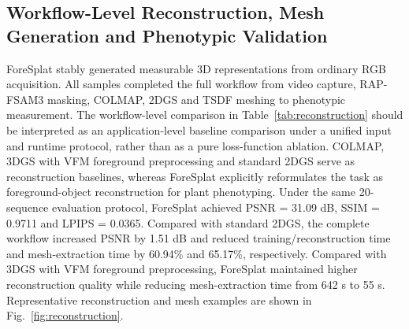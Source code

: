\documentclass[a4paper]{cas-sc}
\begin{document}
\subsection{Workflow-Level Reconstruction, Mesh Generation and Phenotypic Validation}\label{sec:workflow-validation-results}

ForeSplat stably generated measurable 3D representations from ordinary RGB acquisition. All samples completed the full workflow from video capture, RAP-FSAM3 masking, COLMAP, 2DGS and TSDF meshing to phenotypic measurement. The workflow-level comparison in Table~\ref{tab:reconstruction} should be interpreted as an application-level baseline comparison under a unified input and runtime protocol, rather than as a pure loss-function ablation. COLMAP, 3DGS with VFM foreground preprocessing and standard 2DGS serve as reconstruction baselines, whereas ForeSplat explicitly reformulates the task as foreground-object reconstruction for plant phenotyping. Under the same 20-sequence evaluation protocol, ForeSplat achieved PSNR = 31.09 dB, SSIM = 0.9711 and LPIPS = 0.0365. Compared with standard 2DGS, the complete workflow increased PSNR by 1.51 dB and reduced training/reconstruction time and mesh-extraction time by 60.94\% and 65.17\%, respectively. Compared with 3DGS with VFM foreground preprocessing, ForeSplat maintained higher reconstruction quality while reducing mesh-extraction time from 642 s to 55 s. Representative reconstruction and mesh examples are shown in Fig.~\ref{fig:reconstruction}.
\end{document}
